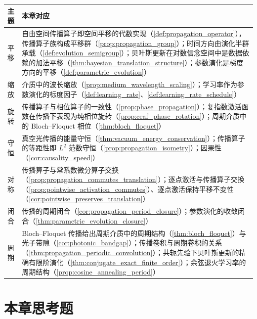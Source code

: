 \begin{center}
\renewcommand{\arraystretch}{1.25}
\begin{tabular}{@{}p{2.2cm} p{10.5cm}@{}}
\toprule
主题 & 本章对应 \\
\midrule
平移 & 自由空间传播算子即空间平移的代数实现（\cref{def:propagation_operator}），传播算子族构成平移群（\cref{prop:propagation_group}）；时间方向由演化半群承载（\cref{def:evolution_semigroup}）；贝叶斯更新在对数信念空间中是数据依赖的加法平移（\cref{thm:bayesian_translation_structure}）；参数演化是梯度方向的平移（\cref{def:parametric_evolution}） \\
缩放 & 介质中的波长缩放（\cref{prop:medium_wavelength_scaling}）；学习率作为参数演化的标度因子（\cref{def:learning_rate}、\cref{def:learning_rate_schedule}） \\
旋转 & 传播算子与相位算子的一致性（\cref{prop:phase_propagation}）；复指数激活函数在传播下表现为纯相位旋转（\cref{prop:ceaf_phase_rotation}）；周期介质中的 Bloch--Floquet 相位（\cref{thm:bloch_floquet}） \\
守恒 & 真空光传播的能量守恒（\cref{thm:vacuum_energy_conservation}）；传播算子的等距性即 $L^2$ 范数守恒（\cref{prop:propagation_isometry}）；因果性（\cref{cor:causality_speed}） \\
对称 & 传播算子与常系数微分算子交换（\cref{prop:propagation_commutes_translation}）；逐点激活与传播算子交换（\cref{prop:pointwise_activation_commutes}）、逐点激活保持平移不变性（\cref{cor:pointwise_preserves_translation}） \\
闭合 & 传播的周期闭合（\cref{cor:propagation_period_closure}）；参数演化的收敛闭合（\cref{thm:parametric_evolution_closure}） \\
周期 & Bloch--Floquet 传播给出周期介质中的周期结构（\cref{thm:bloch_floquet}）与光子带隙（\cref{cor:photonic_bandgap}）；传播卷积与周期卷积的关系（\cref{thm:propagation_periodic_convolution}）；共轭先验下贝叶斯更新的精确有限阶演化（\cref{thm:conjugate_exact_finite_order}）；余弦退火学习率的周期结构（\cref{prop:cosine_annealing_period}） \\
\bottomrule
\end{tabular}
\end{center}


\section*{本章思考题}

